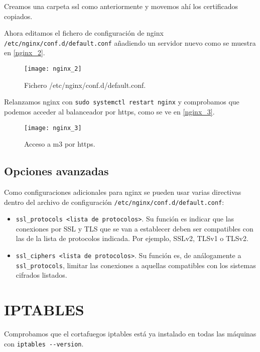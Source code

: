 Creamos una carpeta ssl como anteriormente y movemos ahí los certificados copiados.

Ahora editamos el fichero de configuración de nginx \verb|/etc/nginx/conf.d/default.conf| añadiendo un servidor nuevo como se muestra en \eqref{nginx_2}.

\begin{figure}[h!]
\begin{center}
\caption{Fichero /etc/nginx/conf.d/default.conf.}
\label{nginx_2}
\texttt{[image: nginx\_2]}
\end{center}
\end{figure}

Relanzamos nginx con \verb|sudo systemctl restart nginx| y comprobamos que podemos acceder al balanceador por https, como se ve en \eqref{nginx_3}.

\begin{figure}[h!]
\begin{center}
\caption{Acceso a m3 por https.}
\label{nginx_3}
\texttt{[image: nginx\_3]}
\end{center}
\end{figure}

\section{Opciones avanzadas}

Como configuraciones adicionales para nginx se pueden usar varias directivas dentro del archivo de configuración \verb|/etc/nginx/conf.d/default.conf|:

\begin{itemize}
\item \verb|ssl_protocols <lista de protocolos>|. Su función es indicar que las conexiones por SSL y TLS que se van a establecer deben ser compatibles con las de la lista de protocolos indicada. Por ejemplo, SSLv2, TLSv1 o TLSv2.
\item \verb|ssl_ciphers <lista de protocolos>|. Su función es, de análogamente a \verb|ssl_protocols|, limitar las conexiones a aquellas compatibles con los sistemas cifrados listados.
\end{itemize}

\chapter{IPTABLES}

Comprobamos que el cortafuegos iptables está ya instalado en todas las máquinas con \verb|iptables --version|.

